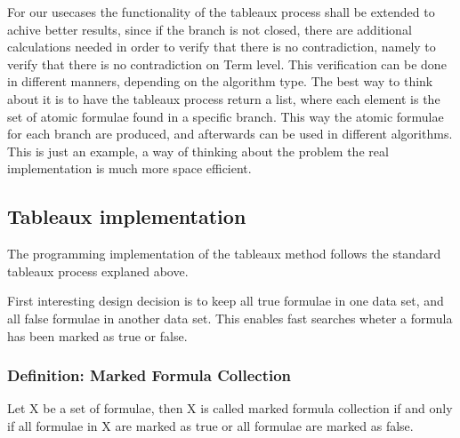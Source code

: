 \documentclass{article}
\begin{document}
		For our usecases the functionality of the tableaux process shall be extended to achive better results, since if the branch is not closed, there are 
		additional calculations needed in order to verify that there is no contradiction, namely to verify that there is no contradiction on Term level.
		This verification can be done in different manners, depending on the algorithm type. The best way to think about it is to have the tableaux process
		return a list, where each element is the set of atomic formulae found in a specific branch. This way the atomic formulae for each branch are produced, and 
		afterwards can be used in different algorithms. This is just an example, a way of thinking about the problem the real implementation is much more space 
		efficient.

	\subsection{Tableaux implementation}
		The programming implementation of the tableaux method follows the standard tableaux process explaned above.

		First interesting design decision is to keep all true formulae in one data set, and all false formulae in another data set.
		This enables fast searches wheter a formula has been marked as true or false.
		
		\subsubsection*{Definition: Marked Formula Collection}
			Let X be a set of formulae, then X is called marked formula collection if and only if all formulae in X are marked as true 
			or all formulae are marked as false.
\end{document}
